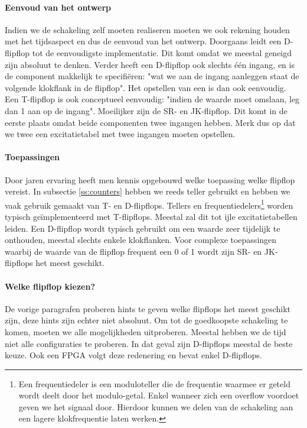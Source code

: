 \paragraph{Eenvoud van het ontwerp}Indien we de schakeling zelf moeten realiseren moeten we ook rekening houden met het tijdsaspect en dus de eenvoud van het ontwerp. Doorgaans leidt een D-flipflop tot de eenvoudigste implementatie. Dit komt omdat we meestal geneigd zijn absoluut te denken. Verder heeft een D-flipflop ook slechts \'e\'en ingang, en is de component makkelijk te specifi\"eren: "wat we aan de ingang aanleggen staat de volgende klokflank in de flipflop". Het opstellen van een  is dan ook eenvoudig. Een T-flipflop is ook conceptueel eenvoudig: "indien de waarde moet omslaan, leg dan 1 aan op de ingang". Moeilijker zijn de SR- en JK-flipflop. Dit komt in de eerste plaats omdat beide componenten twee ingangen hebben. Merk dus op dat we twee een excitatietabel met twee ingangen moeten opstellen.
\paragraph{Toepassingen}Door jaren ervaring heeft men kennis opgebouwd welke toepassing welke flipflop vereist. In subsectie \ref{ss:counters} hebben we reeds teller gebruikt en hebben we vaak gebruik gemaakt van T- en D-flipflops. Tellers en frequentiedelers\footnote{Een frequentiedeler is een moduloteller die de frequentie waarmee er geteld wordt deelt door het modulo-getal. Enkel wanneer zich een overflow voordoet geven we het signaal door. Hierdoor kunnen we delen van de schakeling aan een lagere klokfrequentie laten werken.} worden typisch ge\"implementeerd met T-flipflops. Meestal zal dit tot ijle excitatietabellen leiden. Een D-flipflop wordt typisch gebruikt om een waarde zeer tijdelijk te onthouden, meestal slechts enkele klokflanken. Voor complexe toepassingen waarbij de waarde van de flipflop frequent een 0 of 1 wordt zijn SR- en JK-flipflops het meest geschikt.
\paragraph{Welke flipflop kiezen?}De vorige paragrafen proberen hints te geven welke flipflops het meest geschikt zijn, deze hints zijn echter niet absoluut. Om tot de goedkoopste schakeling te komen, moeten we alle mogelijkheden uitproberen. Meestal hebben we de tijd niet alle configuraties te proberen. In dat geval zijn D-flipflops meestal de beste keuze. Ook een FPGA volgt deze redenering en bevat enkel D-flipflops.
